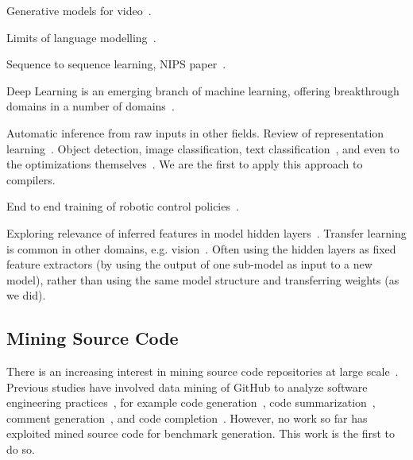 Generative models for video~\cite{Srivastava2015}.

Limits of language modelling~\cite{Jozefowicz2016a}.

Sequence to sequence learning, NIPS paper~\cite{Sutskever2014}.

Deep Learning is an emerging branch of machine learning, offering breakthrough domains in a number of domains~\cite{Wang2017}.

Automatic inference from raw inputs in other fields. Review of representation learning~\cite{Bengio2013}. Object detection, image classification, text classification~\cite{Conneau2016}, and even to the optimizations themselves~\cite{Andrychowicz2016a}. We are the first to apply this approach to compilers.

End to end training of robotic control policies~\cite{Levine2016}.




Exploring relevance of inferred features in model hidden layers~\cite{Yosinski2014}. Transfer learning is common in other domains, e.g. vision~\cite{Razavian2014,Oquab2014}. Often using the hidden layers as fixed feature extractors (by using the output of one sub-model as input to a new model), rather than using the same model structure and transferring weights (as we did).


\subsection{Mining Source Code}

There is an increasing interest in mining source code repositories at large scale~\cite{Allamanis2013a,White2015a,Bird2009}. Previous studies have involved data mining of GitHub to analyze software engineering practices~\cite{Wu2014,Guzman2014,Baishakhi2014a,Vasilescu2015}, for example code generation~\cite{Zhang2015a}, code summarization~\cite{Allamanis2016}, comment generation~\cite{Wong2013}, and code completion~\cite{Raychev2014}. However, no work so far has exploited mined source code for benchmark generation. This work is the first to do so.

